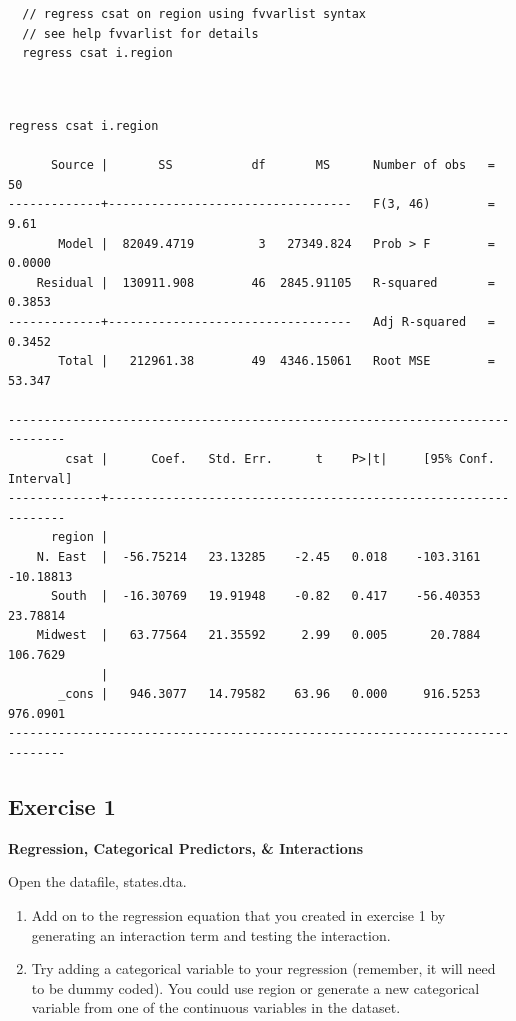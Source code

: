 \documentclass[]{book}
\providecommand{\tightlist}{%
  \setlength{\itemsep}{0pt}\setlength{\parskip}{0pt}}
\begin{document}
\begin{verbatim}
  // regress csat on region using fvvarlist syntax
  // see help fvvarlist for details
  regress csat i.region
\end{verbatim}

\begin{verbatim}


regress csat i.region

      Source |       SS           df       MS      Number of obs   =        50
-------------+----------------------------------   F(3, 46)        =      9.61
       Model |  82049.4719         3   27349.824   Prob > F        =    0.0000
    Residual |  130911.908        46  2845.91105   R-squared       =    0.3853
-------------+----------------------------------   Adj R-squared   =    0.3452
       Total |   212961.38        49  4346.15061   Root MSE        =    53.347

------------------------------------------------------------------------------
        csat |      Coef.   Std. Err.      t    P>|t|     [95% Conf. Interval]
-------------+----------------------------------------------------------------
      region |
    N. East  |  -56.75214   23.13285    -2.45   0.018    -103.3161   -10.18813
      South  |  -16.30769   19.91948    -0.82   0.417    -56.40353    23.78814
    Midwest  |   63.77564   21.35592     2.99   0.005      20.7884    106.7629
             |
       _cons |   946.3077   14.79582    63.96   0.000     916.5253    976.0901
------------------------------------------------------------------------------
\end{verbatim}

\subsection{Exercise 1}\label{exercise-1-8}

\textbf{Regression, Categorical Predictors, \& Interactions}

Open the datafile, states.dta.

\begin{enumerate}
\def\labelenumi{\arabic{enumi}.}
\tightlist
\item
  Add on to the regression equation that you created in exercise 1 by
  generating an interaction term and testing the interaction.
\item
  Try adding a categorical variable to your regression (remember, it
  will need to be dummy coded). You could use region or generate a new
  categorical variable from one of the continuous variables in the
  dataset.
\end{enumerate}
\end{document}
